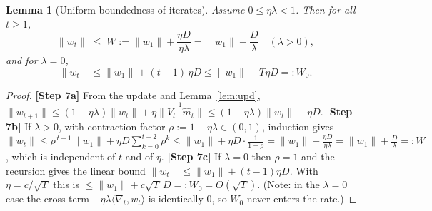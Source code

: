 \documentclass[11pt]{article}
\newtheorem{lemma}{Lemma}
\begin{document}
\begin{lemma}[Uniform boundedness of iterates]\label{lem:wbound}
Assume $0\le\eta\lambda<1$. Then for all $t\ge1$,
\[
\|w_t\| \;\le\; W := \|w_1\| + \frac{\eta D}{\eta\lambda}
=\|w_1\|+\frac{D}{\lambda}\quad(\lambda>0),
\]
and for $\lambda=0$,
\[
\|w_t\|\le \|w_1\| + (t-1)\,\eta D \le \|w_1\| + T\eta D =: W_0 .
\]
\end{lemma}
\begin{proof}
\textbf{[Step 7a]} From the update and Lemma~\ref{lem:upd},
$\|w_{t+1}\|\le(1-\eta\lambda)\|w_t\|+\eta\|\hat V_t^{-1}\hat m_t\|
\le(1-\eta\lambda)\|w_t\|+\eta D$.
\textbf{[Step 7b]} If $\lambda>0$, with contraction factor
$\rho:=1-\eta\lambda\in(0,1)$, induction gives
$\|w_t\|\le \rho^{\,t-1}\|w_1\|+\eta D\sum_{k=0}^{t-2}\rho^k
\le \|w_1\|+\eta D\cdot\frac{1}{1-\rho}=\|w_1\|+\frac{\eta D}{\eta\lambda}
=\|w_1\|+\frac{D}{\lambda}=:W$, which is independent of $t$ and of $\eta$.
\textbf{[Step 7c]} If $\lambda=0$ then $\rho=1$ and the recursion gives the linear
bound $\|w_t\|\le\|w_1\|+(t-1)\eta D$. With $\eta=c/\sqrt T$ this is
$\le\|w_1\|+c\sqrt T\,D=:W_0=O(\sqrt T)$.
(Note: in the $\lambda=0$ case the cross term $-\eta\lambda\langle\nabla_t,w_t\rangle$
is identically $0$, so $W_0$ never enters the rate.)
\end{proof}
\end{document}
